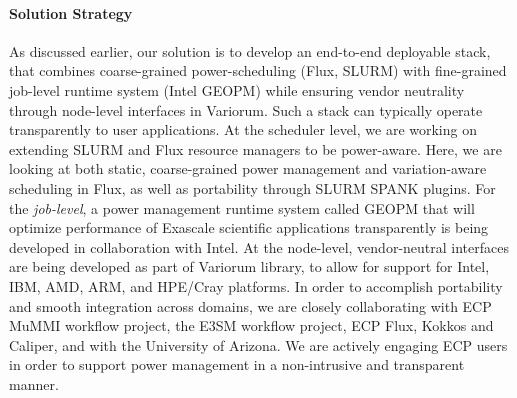 \paragraph{Solution Strategy}
As discussed earlier, our solution is to develop an end-to-end deployable stack, that combines coarse-grained power-scheduling (Flux, SLURM) with fine-grained job-level runtime system (Intel GEOPM) while ensuring vendor neutrality through node-level interfaces in Variorum. Such a stack can typically operate transparently to user applications. At the scheduler level, we are working on extending SLURM and Flux resource managers to be power-aware. Here, we are looking at both static, coarse-grained power management and variation-aware scheduling in Flux, as well as portability through SLURM SPANK plugins. For the \emph{job-level}, a power management runtime system called GEOPM that will optimize performance of Exascale scientific applications transparently is being developed in collaboration with Intel. At the node-level, vendor-neutral interfaces are being developed as part of Variorum library, to allow for support for Intel, IBM, AMD, ARM, and HPE/Cray platforms. In order to accomplish portability and smooth integration across domains, we are closely collaborating with ECP MuMMI workflow project, the E3SM workflow project, ECP Flux, Kokkos and Caliper, and with the University of Arizona. We are actively engaging ECP users in order to support power management in a non-intrusive and transparent manner. 


